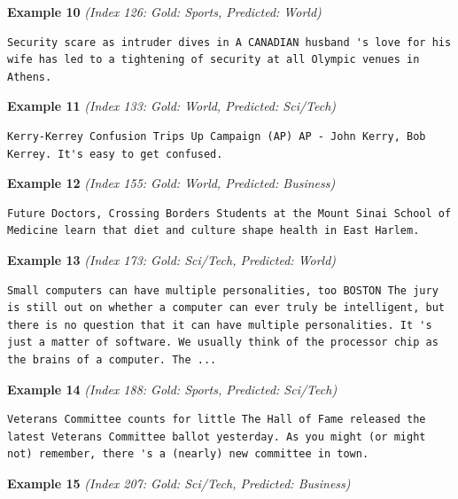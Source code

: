 \noindent
\textbf{Example 10} \quad \textit{(Index 126: Gold: Sports, Predicted: World)}

\begin{Verbatim}[breaklines=true,breakanywhere=true,fontsize=\small]
Security scare as intruder dives in A CANADIAN husband 's love for his wife has led to a tightening of security at all Olympic venues in Athens.
\end{Verbatim}

\noindent
\textbf{Example 11} \quad \textit{(Index 133: Gold: World, Predicted: Sci/Tech)}

\begin{Verbatim}[breaklines=true,breakanywhere=true,fontsize=\small]
Kerry-Kerrey Confusion Trips Up Campaign (AP) AP - John Kerry, Bob Kerrey. It's easy to get confused.
\end{Verbatim}

\noindent
\textbf{Example 12} \quad \textit{(Index 155: Gold: World, Predicted: Business)}

\begin{Verbatim}[breaklines=true,breakanywhere=true,fontsize=\small]
Future Doctors, Crossing Borders Students at the Mount Sinai School of Medicine learn that diet and culture shape health in East Harlem.
\end{Verbatim}

\noindent
\textbf{Example 13} \quad \textit{(Index 173: Gold: Sci/Tech, Predicted: World)}

\begin{Verbatim}[breaklines=true,breakanywhere=true,fontsize=\small]
Small computers can have multiple personalities, too BOSTON The jury is still out on whether a computer can ever truly be intelligent, but there is no question that it can have multiple personalities. It 's just a matter of software. We usually think of the processor chip as the brains of a computer. The ...
\end{Verbatim}

\noindent
\textbf{Example 14} \quad \textit{(Index 188: Gold: Sports, Predicted: Sci/Tech)}

\begin{Verbatim}[breaklines=true,breakanywhere=true,fontsize=\small]
Veterans Committee counts for little The Hall of Fame released the latest Veterans Committee ballot yesterday. As you might (or might not) remember, there 's a (nearly) new committee in town.
\end{Verbatim}

\noindent
\textbf{Example 15} \quad \textit{(Index 207: Gold: Sci/Tech, Predicted: Business)}


